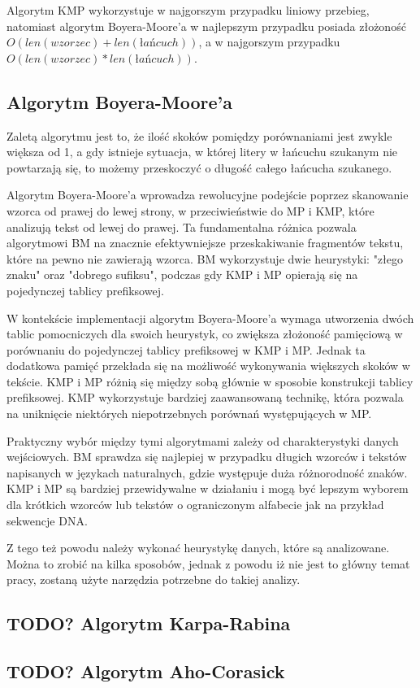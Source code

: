 Algorytm KMP wykorzystuje w najgorszym przypadku liniowy przebieg, natomiast
algorytm Boyera-Moore'a w najlepszym przypadku posiada złożoność $O({len(wzorzec)}+{len(łańcuch)})$, a w 
najgorszym przypadku $O({len(wzorzec)}*{len(łańcuch)})$.

\subsection{Algorytm Boyera-Moore'a}
\label{sch:algoBoyerMoore}

Zaletą algorytmu jest to, że ilość skoków pomiędzy porównaniami jest zwykle 
większa od 1, a gdy istnieje sytuacja, w której litery w łańcuchu szukanym nie
powtarzają się, to możemy przeskoczyć o długość całego łańcucha szukanego.

Algorytm Boyera-Moore'a wprowadza rewolucyjne podejście poprzez skanowanie 
wzorca od prawej do lewej strony, w przeciwieństwie do MP i KMP, które 
analizują tekst od lewej do prawej. Ta fundamentalna różnica pozwala algorytmowi BM na 
znacznie efektywniejsze przeskakiwanie fragmentów tekstu, które na pewno nie 
zawierają wzorca. BM wykorzystuje dwie heurystyki: "złego znaku" oraz "dobrego
sufiksu", podczas gdy KMP i MP opierają się na pojedynczej tablicy prefiksowej.

W kontekście implementacji algorytm Boyera-Moore'a wymaga utworzenia dwóch tablic pomocniczych dla
swoich heurystyk, co zwiększa złożoność pamięciową w porównaniu do pojedynczej 
tablicy prefiksowej w KMP i MP. Jednak ta dodatkowa pamięć przekłada się na 
możliwość wykonywania większych skoków w tekście. KMP i MP różnią się między 
sobą głównie w sposobie konstrukcji tablicy prefiksowej. KMP wykorzystuje 
bardziej zaawansowaną technikę, która pozwala na uniknięcie niektórych 
niepotrzebnych porównań występujących w MP.

Praktyczny wybór między tymi algorytmami zależy od charakterystyki danych
wejściowych. BM sprawdza się najlepiej w przypadku długich wzorców i tekstów
napisanych w językach naturalnych, gdzie występuje duża różnorodność znaków.
KMP i MP są bardziej przewidywalne w działaniu i mogą być lepszym wyborem dla 
krótkich wzorców lub tekstów o ograniczonym alfabecie jak na przykład sekwencje
DNA.

Z tego też powodu należy wykonać heurystykę danych, które są analizowane.
Można to zrobić na kilka sposobów, jednak z powodu iż nie jest to główny temat
pracy, zostaną użyte narzędzia potrzebne do takiej analizy.


\subsection{TODO? Algorytm Karpa-Rabina}
\subsection{TODO? Algorytm Aho-Corasick}